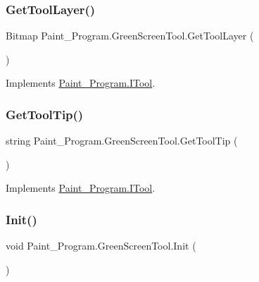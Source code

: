 \subsubsection{\texorpdfstring{Get\+Tool\+Layer()}{GetToolLayer()}}
{\footnotesize\ttfamily Bitmap Paint\+\_\+\+Program.\+Green\+Screen\+Tool.\+Get\+Tool\+Layer (\begin{DoxyParamCaption}{ }\end{DoxyParamCaption})\hspace{0.3cm}{\ttfamily [inline]}}



Implements \mbox{\hyperlink{interface_paint___program_1_1_i_tool_a9b057905515f42a988c166a6a40318e0}{Paint\+\_\+\+Program.\+I\+Tool}}.

\mbox{\label{class_paint___program_1_1_green_screen_tool_af580394652e180ac8f0acfb79704ffa4}} 
\subsubsection{\texorpdfstring{Get\+Tool\+Tip()}{GetToolTip()}}
{\footnotesize\ttfamily string Paint\+\_\+\+Program.\+Green\+Screen\+Tool.\+Get\+Tool\+Tip (\begin{DoxyParamCaption}{ }\end{DoxyParamCaption})\hspace{0.3cm}{\ttfamily [inline]}}



Implements \mbox{\hyperlink{interface_paint___program_1_1_i_tool_ac11f1591587144b6e74f5767bbf1df56}{Paint\+\_\+\+Program.\+I\+Tool}}.

\mbox{\label{class_paint___program_1_1_green_screen_tool_a957c8149c7cc59b1c9734ca5bb5309c7}} 
\subsubsection{\texorpdfstring{Init()}{Init()}}
{\footnotesize\ttfamily void Paint\+\_\+\+Program.\+Green\+Screen\+Tool.\+Init (\begin{DoxyParamCaption}{ }\end{DoxyParamCaption})\hspace{0.3cm}{\ttfamily [inline]}}



